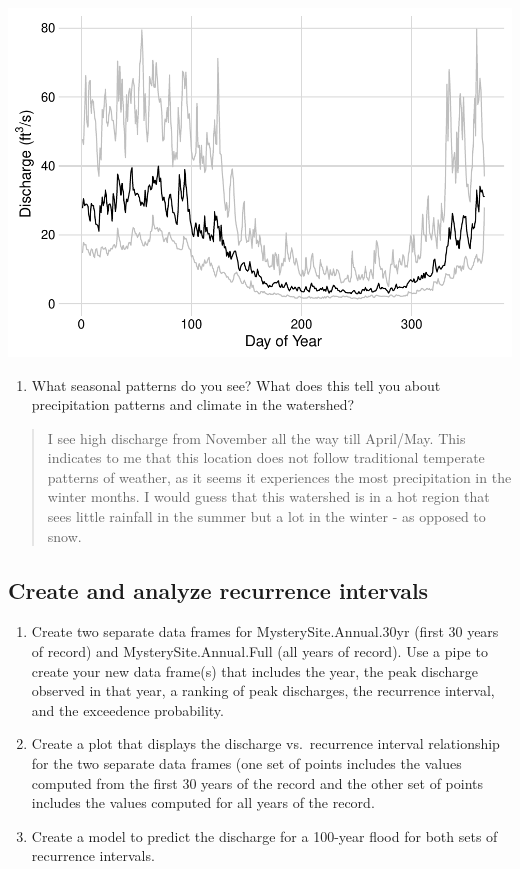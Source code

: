 \documentclass[]{article}
\providecommand{\tightlist}{%
  \setlength{\itemsep}{0pt}\setlength{\parskip}{0pt}}
\begin{document}
\includegraphics{Cai_A03_RiversPhysical_files/figure-latex/unnamed-chunk-2-1.pdf}

\begin{enumerate}
\def\labelenumi{\arabic{enumi}.}
\setcounter{enumi}{7}
\tightlist
\item
  What seasonal patterns do you see? What does this tell you about
  precipitation patterns and climate in the watershed?
\end{enumerate}

\begin{quote}
I see high discharge from November all the way till April/May. This
indicates to me that this location does not follow traditional temperate
patterns of weather, as it seems it experiences the most precipitation
in the winter months. I would guess that this watershed is in a hot
region that sees little rainfall in the summer but a lot in the winter -
as opposed to snow.
\end{quote}

\hypertarget{create-and-analyze-recurrence-intervals}{%
\subsection{Create and analyze recurrence
intervals}\label{create-and-analyze-recurrence-intervals}}

\begin{enumerate}
\def\labelenumi{\arabic{enumi}.}
\setcounter{enumi}{8}
\item
  Create two separate data frames for MysterySite.Annual.30yr (first 30
  years of record) and MysterySite.Annual.Full (all years of record).
  Use a pipe to create your new data frame(s) that includes the year,
  the peak discharge observed in that year, a ranking of peak
  discharges, the recurrence interval, and the exceedence probability.
\item
  Create a plot that displays the discharge vs.~recurrence interval
  relationship for the two separate data frames (one set of points
  includes the values computed from the first 30 years of the record and
  the other set of points includes the values computed for all years of
  the record.
\item
  Create a model to predict the discharge for a 100-year flood for both
  sets of recurrence intervals.
\end{enumerate}
\end{document}
